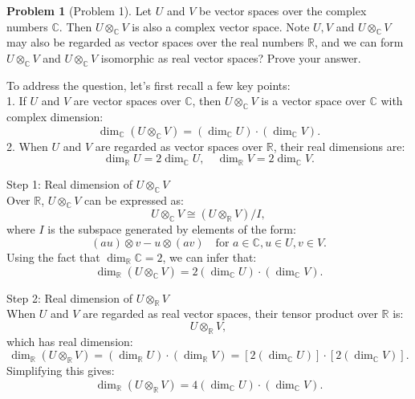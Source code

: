 \documentclass[12pt]{article}
\theoremstyle{definition}
\newtheorem{problem}{Problem}
\begin{document}
\begin{problem}[Problem 1]
    Let $U$ and $V$ be vector spaces over the complex numbers $\mathbb{C}$.
    Then $U \otimes_\mathbb{C} V$ is also a complex vector space. Note $U, V$
    and $U \otimes_\mathbb{C} V$ may also be regarded as vector spaces over the 
    real numbers $\mathbb{R}$, and we can form $U \otimes_\mathbb{C} V$ and 
    $U \otimes_\mathbb{C} V$ isomorphic as real vector spaces? Prove your answer.

    \begin{solution}
        To address the question, let's first recall a few key points:\\
        1. If $U$ and $V$ are vector spaces over $\mathbb{C}$, then $U \otimes_\mathbb{C} V$ is a vector space over $\mathbb{C}$ with complex dimension:
        \[
        \dim_\mathbb{C}(U \otimes_\mathbb{C} V) = (\dim_\mathbb{C} U) \cdot (\dim_\mathbb{C} V).
        \]
        2. When $U$ and $V$ are regarded as vector spaces over $\mathbb{R}$, their real dimensions are:
        \[
        \dim_\mathbb{R} U = 2 \dim_\mathbb{C} U, \quad \dim_\mathbb{R} V = 2 \dim_\mathbb{C} V.
        \]

        Step 1: Real dimension of $U \otimes_\mathbb{C} V$\\
        Over $\mathbb{R}$, $U \otimes_\mathbb{C} V$ can be expressed as:
        \[
        U \otimes_\mathbb{C} V \cong (U \otimes_\mathbb{R} V) / I,
        \]
        where $I$ is the subspace generated by elements of the form:
        \[
        (au) \otimes v - u \otimes (av) \quad \text{for } a \in \mathbb{C}, u \in U, v \in V.
        \]
        Using the fact that $\dim_\mathbb{R} \mathbb{C} = 2$, we can infer that:
        \[
        \dim_\mathbb{R}(U \otimes_\mathbb{C} V) = 2 (\dim_\mathbb{C} U) \cdot (\dim_\mathbb{C} V).
        \]

        Step 2: Real dimension of $U \otimes_\mathbb{R} V$\\
        When $U$ and $V$ are regarded as real vector spaces, their tensor product over $\mathbb{R}$ is:
        \[
        U \otimes_\mathbb{R} V,
        \]
        which has real dimension:
        \[
        \dim_\mathbb{R}(U \otimes_\mathbb{R} V) = (\dim_\mathbb{R} U) \cdot (\dim_\mathbb{R} V) = [2 (\dim_\mathbb{C} U)] \cdot [2 (\dim_\mathbb{C} V)].
        \]
        Simplifying this gives:
        \[
        \dim_\mathbb{R}(U \otimes_\mathbb{R} V) = 4 (\dim_\mathbb{C} U) \cdot (\dim_\mathbb{C} V).
        \]


\end{solution}
\end{problem}
\end{document}
